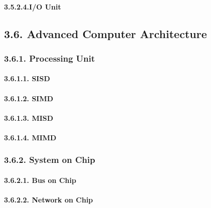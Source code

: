 \documentclass[
]{article}
\begin{document}
\hypertarget{io-unit-1}{%
\paragraph{3.5.2.4.I/O Unit}\label{io-unit-1}}

\hypertarget{advanced-computer-architecture}{%
\subsection{3.6. Advanced Computer
Architecture}\label{advanced-computer-architecture}}

\hypertarget{processing-unit}{%
\subsubsection{3.6.1. Processing Unit}\label{processing-unit}}

\hypertarget{sisd}{%
\paragraph{3.6.1.1. SISD}\label{sisd}}

\hypertarget{simd}{%
\paragraph{3.6.1.2. SIMD}\label{simd}}

\hypertarget{misd}{%
\paragraph{3.6.1.3. MISD}\label{misd}}

\hypertarget{mimd}{%
\paragraph{3.6.1.4. MIMD}\label{mimd}}

\hypertarget{system-on-chip}{%
\subsubsection{3.6.2. System on Chip}\label{system-on-chip}}

\hypertarget{bus-on-chip}{%
\paragraph{3.6.2.1. Bus on Chip}\label{bus-on-chip}}

\hypertarget{network-on-chip}{%
\paragraph{3.6.2.2. Network on Chip}\label{network-on-chip}}
\end{document}
